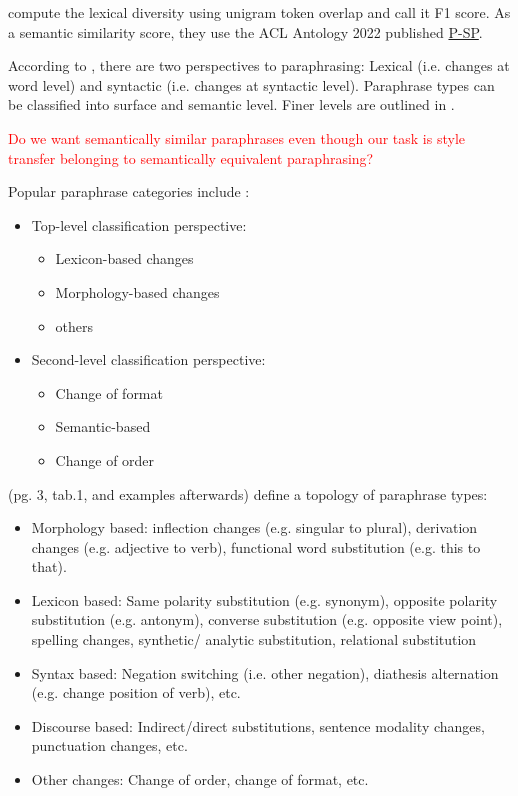 \citet{krishna_paraphrasing_2023} compute the lexical diversity using unigram token overlap and call it F1 score.
As a semantic similarity score, they use the ACL Antology 2022 published \href{https://aclanthology.org/2022.emnlp-demos.38.pdf}{P-SP}.

According to \citet{gohsen_task_oriented_2024}, there are two perspectives to paraphrasing: 
Lexical (i.e. changes at word level) and syntactic (i.e. changes at syntactic level).
Paraphrase types can be classified into surface and semantic level. Finer levels are outlined in \cite{gohsen_task_oriented_2024}.

\textcolor{red}{Do we want semantically similar paraphrases even though our task is style transfer belonging to semantically equivalent paraphrasing?}

Popular paraphrase categories include \cite{fu_learning_2024}:
\begin{itemize}
    \item Top-level classification perspective: 
        \begin{itemize}
            \item Lexicon-based changes
            \item Morphology-based changes
            \item others
        \end{itemize}
    \item Second-level classification perspective:
        \begin{itemize}
            \item Change of format
            \item Semantic-based
            \item Change of order
        \end{itemize}
\end{itemize}
\citet{zhou_paraphrase_2025} (pg. 3, tab.1, and examples afterwards) define a topology of paraphrase types:
\begin{itemize}
    \item Morphology based: inflection changes (e.g. singular to plural), derivation changes (e.g. adjective to verb), functional word substitution (e.g. this to that).
    \item Lexicon based: Same polarity substitution (e.g. synonym), opposite polarity substitution (e.g. antonym), converse substitution (e.g. opposite view point), spelling changes, synthetic/ analytic substitution, relational substitution
    \item Syntax based: Negation switching (i.e. other negation), diathesis alternation (e.g. change position of verb), etc.
    \item Discourse based: Indirect/direct substitutions, sentence modality changes, punctuation changes, etc.
    \item Other changes: Change of order, change of format, etc.
\end{itemize}

